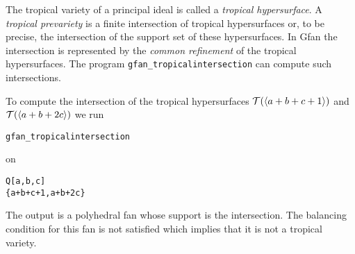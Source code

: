 The tropical variety of a principal ideal is called a \emph{tropical
hypersurface}. A \emph{tropical prevariety} is a finite intersection of
tropical hypersurfaces or, to be precise, the intersection of the
support set of these hypersurfaces. In Gfan the intersection is
represented by the \emph{common refinement} of the tropical
hypersurfaces. The program \texttt{gfan\_tropicalintersection} can
compute such intersections.
\begin{example}
To compute the intersection of the tropical hypersurfaces $ \mathcal{T} (\langle a+b+c+1\rangle)$ and $ \mathcal{T} (\langle a+b+2c\rangle)$ we run
\begin{verbatim}
gfan_tropicalintersection
\end{verbatim} 
on
\begin{verbatim}
Q[a,b,c]
{a+b+c+1,a+b+2c}
\end{verbatim}
The output is a polyhedral fan whose support is the intersection. The
balancing condition for this fan is not satisfied which implies that it
is not a tropical variety.


\end{example}

